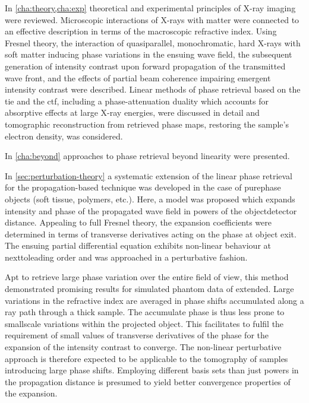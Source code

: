 \documentclass[
twoside,
openright,
titlepage,
numbers=noenddot,
headinclude,
fleqn,
a4paper,
footinclude=true,
cleardoublepage=empty,
abstractoff,
BCOR=5mm,
paper=a4,
fontsize=11pt,
british,ngerman,american,
]{scrreprt}
\begin{document}
In \cref{cha:theory,cha:exp} theoretical and experimental principles
of X-ray imaging were reviewed.  Microscopic interactions of X-rays
with matter were connected to an effective description in terms of the
macroscopic refractive index.  Using Fresnel theory, the interaction
of quasi\hyph parallel, monochromatic, hard X-rays with soft matter
inducing phase variations in the ensuing wave field, the subsequent
generation of intensity contrast upon forward propagation of the
transmitted wave front, and the effects of partial beam coherence
impairing emergent intensity contrast were described.  Linear methods
of phase retrieval based on the \acl{tie} and the \acl{ctf}, including
a phase-attenuation duality which accounts for absorptive effects at
large X-ray energies, were discussed in detail and tomographic
reconstruction from retrieved phase maps, restoring the sample's
electron density, was considered.

In \cref{cha:beyond} approaches to phase retrieval beyond linearity
were presented.  

In \cref{sec:perturbation-theory} a systematic extension of the linear
phase retrieval for the propagation-based technique was developed in
the case of pure\hyph phase objects (soft tissue, polymers, etc.).
Here, a model was proposed which expands intensity and phase of the
propagated wave field in powers of the object\hyph detector distance.
Appealing to full Fresnel theory, the expansion coefficients were
determined in terms of transverse derivatives acting on the phase at
object exit.  The ensuing partial differential equation exhibits
non-linear behaviour at next\hyph to\hyph leading order and was
approached in a perturbative fashion.

Apt to retrieve large phase variation over the entire field of view,
this method demonstrated promising results for simulated phantom data
of extended.  Large variations in the refractive index are averaged in
phase shifts accumulated along a ray path through a thick sample.  The
accumulate phase is thus less prone to small\hyph scale variations
within the projected object.  This facilitates to fulfil the
requirement of small values of transverse derivatives of the phase for
the expansion of the intensity contrast to converge.  The non-linear
perturbative approach is therefore expected to be applicable to the
tomography of samples introducing large phase shifts.  Employing
different basis sets than just powers in the propagation distance is
presumed to yield better convergence properties of the expansion.
\end{document}
